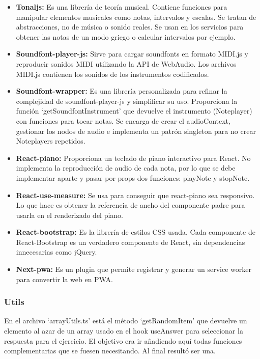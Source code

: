 \documentclass[12pt,twoside,titlepage]{report}
\begin{document}
\begin{itemize}
    \item \textbf{Tonaljs:} Es una librería de teoría musical. Contiene funciones para manipular elementos musicales como notas, intervalos y escalas. Se tratan de abstracciones, no de música o sonido reales. Se usan en los servicios para obtener las notas de un modo griego o calcular intervalos por ejemplo.
    \item \textbf{Soundfont-player-js:} Sirve para cargar soundfonts en formato MIDI.js y reproducir sonidos MIDI utilizando la API de WebAudio. Los archivos MIDI.js contienen los sonidos de los instrumentos codificados.
    \item \textbf{Soundfont-wrapper:} Es una librería personalizada para refinar la complejidad de soundfont-player-js y simplificar su uso. Proporciona la función ‘getSoundfontInstrument’ que devuelve el instrumento (Noteplayer) con funciones para tocar notas. Se encarga de crear el audioContext, gestionar los nodos de audio e implementa un patrón singleton para no crear Noteplayers repetidos.
    \item \textbf{React-piano:} Proporciona un teclado de piano interactivo para React. No implementa la reproducción de audio de cada nota, por lo que se debe implementar aparte y pasar por props dos funciones: playNote y stopNote.
    \item \textbf{React-use-measure:} Se usa para conseguir que react-piano sea responsivo. Lo que hace es obtener la referencia de ancho del componente padre para usarla en el renderizado del piano.
    \item \textbf{React-bootstrap:} Es la librería de estilos CSS usada. Cada componente de React-Bootstrap es un verdadero componente de React, sin dependencias innecesarias como jQuery.
    \item \textbf{Next-pwa:} Es un plugin que permite registrar y generar un service worker para convertir la web en PWA.
\end{itemize}

\subsubsection{Utils}
En el archivo ‘arrayUtils.ts’ está el método ‘getRandomItem’ que devuelve un elemento al azar de un array usado en el hook useAnswer para seleccionar la respuesta para el ejercicio. El objetivo era ir añadiendo aquí todas funciones complementarias que se fuesen necesitando. Al final resultó ser una.
\end{document}
